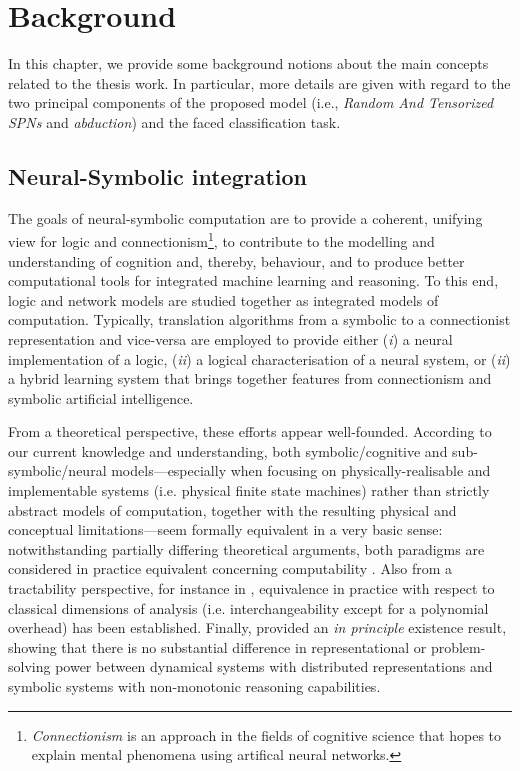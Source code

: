 \chapter{Background}
\label{Chapter2}
In this chapter, we provide some background notions about the main concepts related to the thesis work. In particular, more details are given with regard to the two principal components of the proposed model (i.e., \textit{Random And Tensorized SPNs} and \textit{abduction}) and the faced classification task.

\section{Neural-Symbolic integration}
The goals of neural-symbolic computation are to provide a coherent, unifying view for logic and connectionism\footnote{\textit{Connectionism} is an approach in the fields of cognitive science that hopes to explain mental phenomena using artifical neural networks.}, to contribute to the modelling and understanding of cognition and, thereby, behaviour, and to produce better computational tools for integrated machine learning and reasoning. To this end, logic and network models are studied together as integrated models of computation. Typically, translation algorithms from a symbolic to a connectionist representation and vice-versa are employed to provide either (\textit{i}) a neural implementation of a logic, (\textit{ii}) a logical characterisation of a neural system, or (\textit{ii}) a hybrid learning system that brings together features from connectionism and symbolic artificial intelligence.

From a theoretical perspective, these efforts appear well-founded. According to our current knowledge and understanding, both symbolic/cognitive and sub-symbolic/neural models—especially when focusing on physically-realisable and implementable systems (i.e. physical finite state machines) rather than strictly abstract models of computation, together with the resulting physical and conceptual limitations—seem formally equivalent in a very basic sense: notwithstanding partially differing theoretical arguments, both paradigms are considered in practice equivalent concerning computability \cite{10.5555/343643}. Also from a tractability perspective, for instance in \cite{Rooij2008099398432}, equivalence in practice with respect to classical dimensions of analysis (i.e. interchangeability except for a polynomial overhead) has been established. Finally, \cite{Leitgeb200508189202146} provided an \textit{in principle} existence result, showing that there is no substantial difference in representational or problem-solving power between dynamical systems with distributed representations and symbolic systems with non-monotonic reasoning capabilities.

